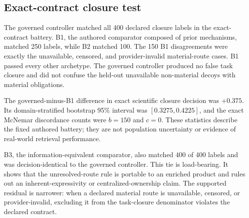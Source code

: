 \subsection{Exact-contract closure test}
\label{sec:p2x}

The governed controller matched all 400 declared closure labels in the
exact-contract battery. B1, the authored comparator composed of prior mechanisms,
matched 250 labels, while B2 matched 100. The 150 B1 disagreements were exactly
the unavailable, censored, and provider-invalid material-route cases. B1 passed
every other archetype. The governed controller produced no false task closure
and did not confuse the held-out unavailable non-material decoys with material
obligations.

The governed-minus-B1 difference in exact scientific closure decision was
$+0.375$. Its domain-stratified bootstrap 95\% interval was
$[0.3275,0.4225]$, and the exact McNemar discordance counts were $b=150$ and
$c=0$. These statistics describe the fixed authored battery; they are not
population uncertainty or evidence of real-world retrieval performance.

B3, the information-equivalent comparator, also matched 400 of 400 labels and
was decision-identical to the governed controller. This tie is load-bearing. It
shows that the unresolved-route rule is portable to an enriched product and
rules out an inherent-expressivity or centralized-ownership claim. The supported
residual is narrower: when a declared material route is unavailable, censored,
or provider-invalid, excluding it from the task-closure denominator violates
the declared contract.
